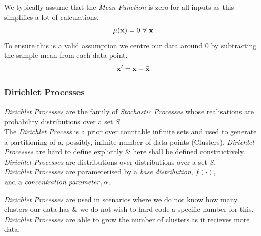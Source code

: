 \documentclass[11pt,a4paper]{article}
\begin{document}
We typically assume that the \textit{Mean Function} is zero for all inputs as this simplifies a lot of calculations.
$$\mu(\textbf{x})=0\ \forall\ \textbf{x}$$
To ensure this is a valid assumption we centre our data around 0 by subtracting the sample mean from each data point.
$$\textbf{x}'=\textbf{x}-\bar{\textbf{x}}$$

\subsubsection{Dirichlet Processes}

\textit{Dirichlet Processes} are the family of \textit{Stochastic Processes} whose realisations are probability distributions over a set $S$.\\
The \textit{Dirichlet Process} is a prior over countable infinite sets and used to generate a partitioning of a, possibly, infinite number of data points (Clusters).
\textit{Dirichlet Processes} are hard to define explicitly \& here shall be defined constructively.\\
\nb \textit{Dirichlet Processes} are distributions over distributions over a set $S$.\\

\textit{Dirichlet Processes} are parameterised by a \textit{base distribution}, $f(\cdot)$, ${\text{and a \textit{concentration parameter}}, \alpha}$.\\


\textit{Dirichlet Processes} are used in scenarios where we do not know how many clusters our data has \& we do not wish to hard code a specific number for this. \textit{Dirichlet Processes} are able to grow the number of clusters as it recieves more data.\\
\end{document}
